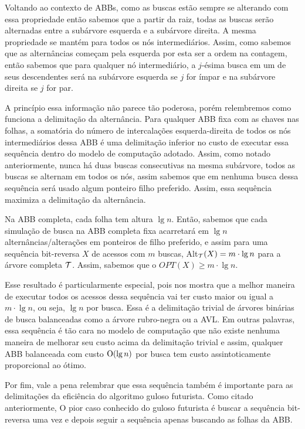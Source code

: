 Voltando ao contexto de ABBs, como as buscas estão sempre se alterando com essa propriedade então sabemos que a partir da raiz, todas as buscas serão alternadas entre a subárvore esquerda e a subárvore direita. A mesma propriedade se mantém para todos os nós intermediários. Assim, como sabemos que as alternâncias começam pela esquerda por esta ser a ordem na contagem, então sabemos que para qualquer nó intermediário, a $j$-ésima busca em um de seus descendentes será na subárvore esquerda se $j$ for ímpar e na subárvore direita se $j$ for par.

A princípio essa informação não parece tão poderosa, porém relembremos como funciona a delimitação da alternância. Para qualquer ABB fixa com as chaves nas folhas, a somatória do número de intercalações esquerda-direita de todos os nós intermediários dessa ABB é uma delimitação inferior no custo de executar essa sequência dentro do modelo de computação adotado. Assim, como notado anteriormente, nunca há duas buscas consecutivas na mesma subárvore, todos as buscas se alternam em todos os nós, assim sabemos que em nenhuma busca dessa sequência será usado algum ponteiro filho preferido. Assim, essa sequência maximiza a delimitação da alternância.

Na ABB completa, cada folha tem altura $\lg n$. Então, sabemos que cada simulação de busca na ABB completa fixa acarretará em $\lg n$ alternâncias/alterações em ponteiros de filho preferido, e assim para uma sequência bit-reversa $X$ de acessos com $m$ buscas, Alt$_{\mathcal{T}}(X) = m \cdot \lg n$ para a árvore completa $\mathcal{T}$. Assim, sabemos que o $OPT(X) \geq m \cdot \lg n$.

Esse resultado é particularmente especial, pois nos mostra que a melhor maneira de executar todos os acessos dessa sequência vai ter custo maior ou igual a $m \cdot \lg n$, ou seja, $\lg n$ por busca. Essa é a delimitação trivial de árvores binárias de busca balanceadas como a árvore rubro-negra ou a AVL. Em outras palavras, essa sequência é tão cara no modelo de computação que não existe nenhuma maneira de melhorar seu custo acima da delimitação trivial e assim, qualquer ABB balanceada com custo $\mathrm{O}(\lg n)$ por busca tem custo assintoticamente proporcional ao ótimo.

Por fim, vale a pena relembrar que essa sequência também é importante para as delimitações da eficiência do algoritmo guloso futurista. Como citado anteriormente, O pior caso conhecido do guloso futurista é buscar a sequência bit-reversa uma vez e depois seguir a sequência apenas buscando as folhas da ABB.

